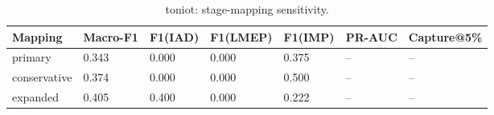 \begin{table}[t]
\centering
\caption{toniot: stage-mapping sensitivity.}
\label{tab:toniot_stage_mapping_sensitivity}
\begin{tabular}{lllllll}
\toprule
Mapping & Macro-F1 & F1(IAD) & F1(LMEP) & F1(IMP) & PR-AUC & Capture@5\% \\
\midrule
primary & 0.343 & 0.000 & 0.000 & 0.375 & -- & -- \\
conservative & 0.374 & 0.000 & 0.000 & 0.500 & -- & -- \\
expanded & 0.405 & 0.400 & 0.000 & 0.222 & -- & -- \\
\bottomrule
\end{tabular}
\end{table}
